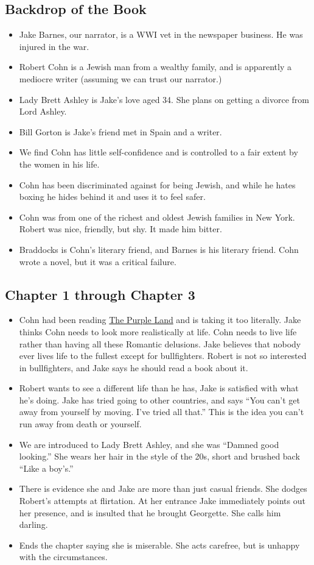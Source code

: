 \documentclass[11pt]{article}
\begin{document}
\subsection{Backdrop of the Book}
\begin{itemize}
	\item Jake Barnes, our narrator, is a WWI vet in the newspaper business.  
		He was injured in the war.
	\item Robert Cohn is a Jewish man from a wealthy family, and is apparently 
		a mediocre writer (assuming we can trust our narrator.)
	\item Lady Brett Ashley is Jake's love aged 34.  She plans on getting a 
		divorce from Lord Ashley.
	\item Bill Gorton is Jake's friend met in Spain and a writer.
	\item We find Cohn has little self-confidence and is controlled to a fair 
		extent by the women in his life.
	\item Cohn has been discriminated against for being Jewish, and while he 
		hates boxing he hides behind it and uses it to feel safer.
	\item Cohn was from one of the richest and oldest Jewish families in New 
		York.  Robert was nice, friendly, but shy.  It made him bitter.
	\item Braddocks is Cohn's literary friend, and Barnes is his literary 
		friend.  Cohn wrote a novel, but it was a critical failure.
\end{itemize}
\subsection{Chapter 1 through Chapter 3}
\begin{itemize}
	\item Cohn had been reading \underline{The Purple Land} and is taking it 
		too literally.  Jake thinks Cohn needs to look more realistically at 
		life.  Cohn needs to live life rather than having all these Romantic 
		delusions.  Jake believes that nobody ever lives life to the fullest 
		except for bullfighters.  Robert is not so interested in bullfighters, 
		and Jake says he should read a book about it.
	\item Robert wants to see a different life than he has, Jake is satisfied 
		with what he's doing.  Jake has tried going to other countries, and 
		says ``You can't get away from yourself by moving.  I've tried all 
		that.''  This is the idea you can't run away from death or yourself.
	\item We are introduced to Lady Brett Ashley, and she was ``Damned good 
		looking.''  She wears her hair in the style of the 20s, short and 
		brushed back ``Like a boy's.''
	\item There is evidence she and Jake are more than just casual friends.  
		She dodges Robert's attempts at flirtation.  At her entrance Jake 
		immediately points out her presence, and is insulted that he brought 
		Georgette.  She calls him darling.
	\item Ends the chapter saying she is miserable.  She acts carefree, but
		is unhappy with the circumstances.
\end{itemize}
\end{document}

